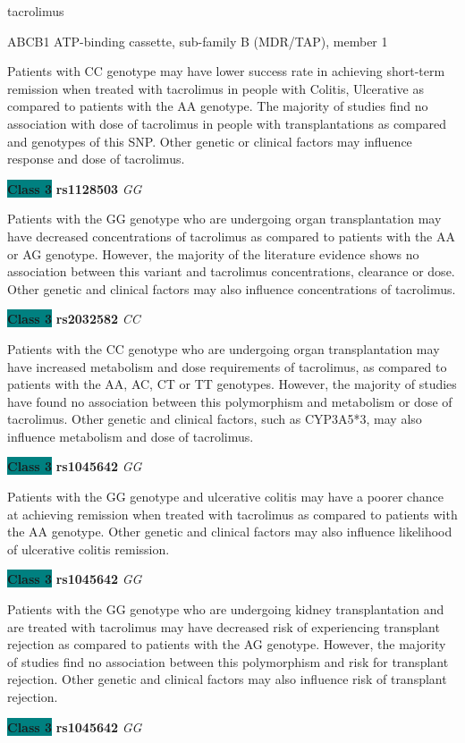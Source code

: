 \documentclass{resume} %
\begin{document}
\begin{rSection}{ tacrolimus }
\begin{rSubsection}{ ABCB1 }{ ATP-binding cassette, sub-family B (MDR/TAP), member 1 }{}{}
\item[] Patients with CC genotype may have lower success rate in achieving short-term remission when treated with tacrolimus in people with Colitis, Ulcerative as compared to patients with the AA genotype. The majority of studies find no association with dose of tacrolimus in people with transplantations as compared and genotypes of this SNP. Other genetic or clinical factors may influence response and dose of tacrolimus.\item \textbf{\colorbox{teal} {Class 3}} \textbf{ rs1128503 } \textit{ GG }
\item[] Patients with the GG genotype who are undergoing organ transplantation may have decreased concentrations of tacrolimus as compared to patients with the AA or AG genotype. However, the majority of the literature evidence shows no association between this variant and tacrolimus concentrations, clearance or dose. Other genetic and clinical factors may also influence concentrations of tacrolimus. \item \textbf{\colorbox{teal} {Class 3}} \textbf{ rs2032582 } \textit{ CC }
\item[] Patients with the CC genotype who are undergoing organ transplantation may have increased metabolism and dose requirements of tacrolimus, as compared to patients with the AA, AC, CT or TT genotypes. However, the majority of studies have found no association between this polymorphism and metabolism or dose of tacrolimus. Other genetic and clinical factors, such as CYP3A5*3, may also influence metabolism and dose of tacrolimus.\item \textbf{\colorbox{teal} {Class 3}} \textbf{ rs1045642 } \textit{ GG }
\item[] Patients with the GG genotype and ulcerative colitis may have a poorer chance at achieving remission when treated with tacrolimus as compared to patients with the AA genotype. Other genetic and clinical factors may also influence likelihood of ulcerative colitis remission.\item \textbf{\colorbox{teal} {Class 3}} \textbf{ rs1045642 } \textit{ GG }
\item[] Patients with the GG genotype who are undergoing kidney transplantation and are treated with tacrolimus may have decreased risk of experiencing transplant rejection as compared to patients with the AG genotype. However, the majority of studies find no association between this polymorphism and risk for transplant rejection. Other genetic and clinical factors may also influence risk of transplant rejection.\item \textbf{\colorbox{teal} {Class 3}} \textbf{ rs1045642 } \textit{ GG }

\end{rSubsection}
\end{rSection}
\end{document}
